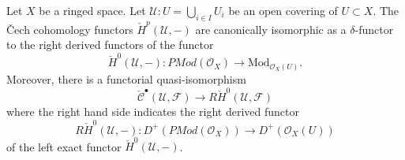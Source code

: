 \begin{lemma}
\label{lemma-cech-cohomology-derived-presheaves}
Let $X$ be a ringed space.
Let $\mathcal{U} : U = \bigcup_{i \in I} U_i$
be an open covering of $U \subset X$.
The {\v C}ech cohomology functors $\check{H}^p(\mathcal{U}, -)$
are canonically isomorphic as a $\delta$-functor to
the right derived functors of the functor
$$
\check{H}^0(\mathcal{U}, -) :
\textit{PMod}(\mathcal{O}_X)
\longrightarrow
\text{Mod}_{\mathcal{O}_X(U)}.
$$
Moreover, there is a functorial quasi-isomorphism
$$
\check{\mathcal{C}}^\bullet(\mathcal{U}, \mathcal{F})
\longrightarrow
R\check{H}^0(\mathcal{U}, \mathcal{F})
$$
where the right hand side indicates the right derived functor
$$
R\check{H}^0(\mathcal{U}, -) :
D^{+}(\textit{PMod}(\mathcal{O}_X))
\longrightarrow
D^{+}(\mathcal{O}_X(U))
$$
of the left exact functor $\check{H}^0(\mathcal{U}, -)$.
\end{lemma}

